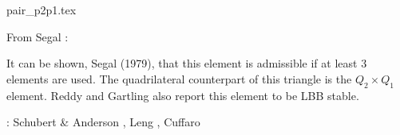 \begin{flushright} {\tiny {\color{gray} pair\_p2p1.tex}} \end{flushright}

\noindent
\begin{minipage}{0.54\textwidth}
From Segal \cite{segal}: 

It can be shown, Segal (1979), that this element is admissible if at least 3 elements 
are used. The quadrilateral counterpart of this triangle is the $Q_2\times Q_1$ element.
Reddy and Gartling \cite[p179]{reddybook2} also report this element to be LBB stable.

\Literature: Schubert \& Anderson \cite{scan85}, Leng \etal \cite{lejx14}, Cuffaro \etal \cite{cump20}
\end{minipage}
\hfill
\begin{minipage}{0.42\textwidth}
\begin{center}

\end{center}
\end{minipage}




